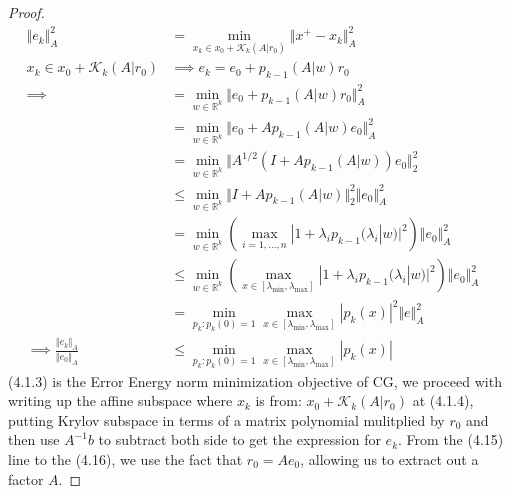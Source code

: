 \documentclass[]{article}
\theoremstyle{definition}
\begin{document}
        \begin{proof}
            \begin{align}
                \Vert e_k\Vert_A^2 & =
                \min_{x_k \in x_0 + \mathcal K_k(A|r_0)}
                \Vert 
                    x^+ - x_k
                \Vert_A^2
                \\
                x_k \in x_0 + \mathcal K_k(A|r_0) 
                & \implies
                e_k = e_0 + p_{k - 1}(A|w)r_0
                \\
                \implies  &=
                \min_{w\in \mathbb R^k}
                \Vert 
                    e_0 + p_{k - 1}(A|w)r_0
                \Vert_A^2
                \\
                &= \min_{w\in \mathbb R^k}
                \Vert 
                    e_0 + Ap_{k - 1}(A|w)e_0
                \Vert_A^2
                \\
                &= \min_{w\in \mathbb R^k}
                \Vert 
                    A^{1/2}(I + Ap_{k - 1}(A|w))e_0
                \Vert_2^2
                \\
                &\le
                \min_{w\in \mathbb R^k}
                \Vert 
                    I + Ap_{k - 1}(A|w)
                \Vert_2^2\Vert e_0\Vert_A^2 \quad 
                \\
                & = 
                \min_{w\in \mathbb R^k}
                \left(
                    \max_{i = 1, \dots, n}
                    |1 + \lambda_i p_{k - 1}(\lambda_i|w)|^2
                \right)\Vert e_0\Vert_A^2
                \quad
                \\
                & \le 
                \min_{w\in \mathbb R^k}
                \left(
                    \max_{x\in [\lambda_{\min}, \lambda_{\max}]}
                    |1 + \lambda_i p_{k - 1}(\lambda_i|w)|^2
                \right)\Vert e_0\Vert_A^2
                \quad 
                \\
                &= 
                \min_{p_{k}: p_{k}(0) = 1}
                \max_{x\in [\lambda_{\min}, \lambda_{\max}]}
                | p_{k}(x)|^2 \Vert e\Vert_A^2
                \\
                \implies
                \frac{\Vert e_k\Vert_A}{\Vert e_0\Vert_A} &\le 
                \min_{p_{k}: p_{k}(0) = 1}\max_{x\in [\lambda_{\text{min}}, \lambda_{\text{max}}]} |p_{k}(x)|
            \end{align}
            (4.1.3) is the Error Energy norm minimization objective of CG, we proceed with writing up the affine subspace where $x_k$ is from: $x_0 + \mathcal K_k(A|r_0)$ at (4.1.4), putting Krylov subspace in terms of a matrix polynomial mulitplied by $r_0$ and then use $A^{-1}b$ to subtract both side to get the expression for $e_k$. From the (4.15) line to the (4.16), we use the fact that $r_0 = Ae_0$, allowing us to extract out a factor $A$. 

\end{proof}
\end{document}
